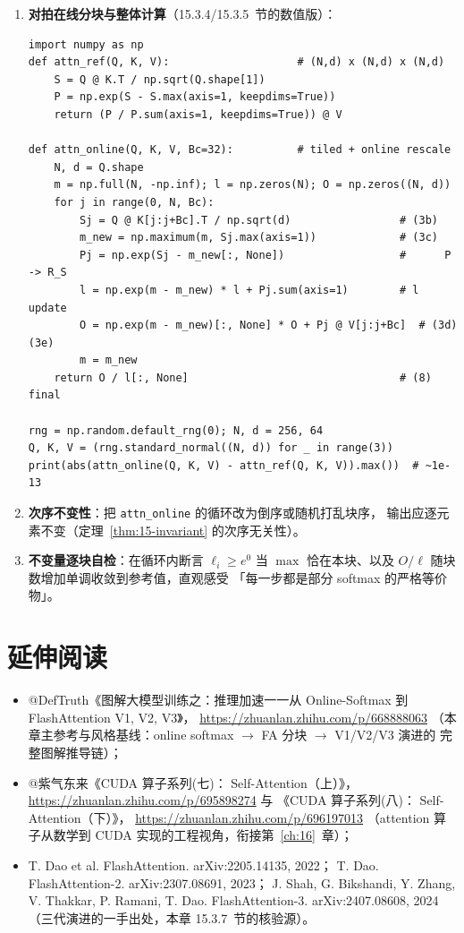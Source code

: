 \begin{enumerate}[itemsep=0pt,topsep=2pt]
  \item \textbf{对拍在线分块与整体计算}（15.3.4/15.3.5~节的数值版）：
\begin{lstlisting}
import numpy as np
def attn_ref(Q, K, V):                    # (N,d) x (N,d) x (N,d)
    S = Q @ K.T / np.sqrt(Q.shape[1])
    P = np.exp(S - S.max(axis=1, keepdims=True))
    return (P / P.sum(axis=1, keepdims=True)) @ V

def attn_online(Q, K, V, Bc=32):          # tiled + online rescale
    N, d = Q.shape
    m = np.full(N, -np.inf); l = np.zeros(N); O = np.zeros((N, d))
    for j in range(0, N, Bc):
        Sj = Q @ K[j:j+Bc].T / np.sqrt(d)                 # (3b)
        m_new = np.maximum(m, Sj.max(axis=1))             # (3c)
        Pj = np.exp(Sj - m_new[:, None])                  #      P -> R_S
        l = np.exp(m - m_new) * l + Pj.sum(axis=1)        # l update
        O = np.exp(m - m_new)[:, None] * O + Pj @ V[j:j+Bc]  # (3d)(3e)
        m = m_new
    return O / l[:, None]                                 # (8) final

rng = np.random.default_rng(0); N, d = 256, 64
Q, K, V = (rng.standard_normal((N, d)) for _ in range(3))
print(abs(attn_online(Q, K, V) - attn_ref(Q, K, V)).max())  # ~1e-13
\end{lstlisting}
  \item \textbf{次序不变性}：把 \texttt{attn\_online} 的循环改为倒序或随机打乱块序，
        输出应逐元素不变（定理~\ref{thm:15-invariant} 的次序无关性）。
  \item \textbf{不变量逐块自检}：在循环内断言 $\ell_i \ge e^{0}$ 当
        $\max$ 恰在本块、以及 $O/\ell$ 随块数增加单调收敛到参考值，直观感受
        「每一步都是部分 softmax 的严格等价物」。
\end{enumerate}

\section*{延伸阅读}

\begin{itemize}
  \item @DefTruth《图解大模型训练之：推理加速一一从 Online-Softmax 到
        FlashAttention V1, V2, V3》，
        \url{https://zhuanlan.zhihu.com/p/668888063}
        （本章主参考与风格基线：online softmax $\to$ FA 分块 $\to$ V1/V2/V3 演进的
        完整图解推导链）；
  \item @紫气东来《CUDA 算子系列(七)： Self-Attention（上）》，
        \url{https://zhuanlan.zhihu.com/p/695898274} 与
        《CUDA 算子系列(八)： Self-Attention（下）》，
        \url{https://zhuanlan.zhihu.com/p/696197013}
        （attention 算子从数学到 CUDA 实现的工程视角，衔接第~\ref{ch:16}~章）；
  \item T. Dao et al. FlashAttention. arXiv:2205.14135, 2022；
        T. Dao. FlashAttention-2. arXiv:2307.08691, 2023；
        J. Shah, G. Bikshandi, Y. Zhang, V. Thakkar, P. Ramani, T. Dao.
        FlashAttention-3. arXiv:2407.08608, 2024
        （三代演进的一手出处，本章 15.3.7~节的核验源）。
\end{itemize}
